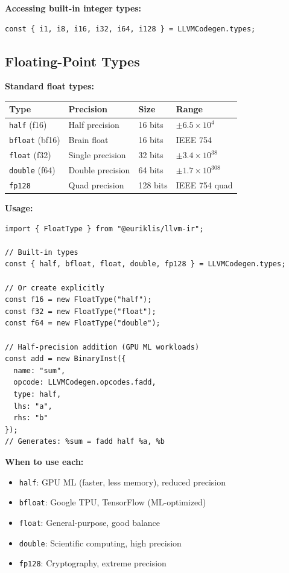 \documentclass[11pt]{article}
\begin{document}
\textbf{Accessing built-in integer types:}
\begin{lstlisting}[style=ts]
const { i1, i8, i16, i32, i64, i128 } = LLVMCodegen.types;
\end{lstlisting}

\subsection{Floating-Point Types}

\textbf{Standard float types:}
\begin{center}
\begin{tabular}{|l|l|l|l|}
\hline
\textbf{Type} & \textbf{Precision} & \textbf{Size} & \textbf{Range} \\
\hline
\texttt{half} (f16) & Half precision & 16 bits & $\pm 6.5 \times 10^4$ \\
\texttt{bfloat} (bf16) & Brain float & 16 bits & IEEE 754 \\
\texttt{float} (f32) & Single precision & 32 bits & $\pm 3.4 \times 10^{38}$ \\
\texttt{double} (f64) & Double precision & 64 bits & $\pm 1.7 \times 10^{308}$ \\
\texttt{fp128} & Quad precision & 128 bits & IEEE 754 quad \\
\hline
\end{tabular}
\end{center}

\textbf{Usage:}
\begin{lstlisting}[style=ts]
import { FloatType } from "@euriklis/llvm-ir";

// Built-in types
const { half, bfloat, float, double, fp128 } = LLVMCodegen.types;

// Or create explicitly
const f16 = new FloatType("half");
const f32 = new FloatType("float");
const f64 = new FloatType("double");

// Half-precision addition (GPU ML workloads)
const add = new BinaryInst({
  name: "sum",
  opcode: LLVMCodegen.opcodes.fadd,
  type: half,
  lhs: "a",
  rhs: "b"
});
// Generates: %sum = fadd half %a, %b
\end{lstlisting}

\textbf{When to use each:}
\begin{itemize}[noitemsep]
  \item \texttt{half}: GPU ML (faster, less memory), reduced precision
  \item \texttt{bfloat}: Google TPU, TensorFlow (ML-optimized)
  \item \texttt{float}: General-purpose, good balance
  \item \texttt{double}: Scientific computing, high precision
  \item \texttt{fp128}: Cryptography, extreme precision
\end{itemize}
\end{document}
